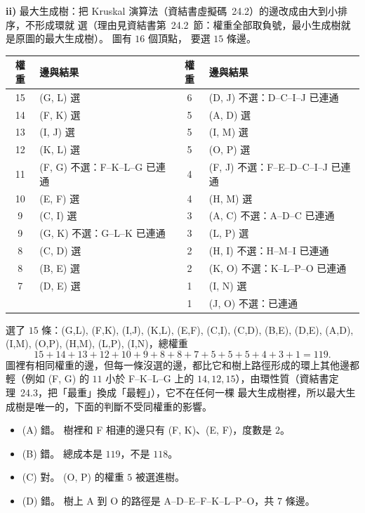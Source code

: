 \begin{pastsoln}
\textbf{ii)} 最大生成樹：把 Kruskal 演算法（資結書虛擬碼~24.2）的邊改成由大到小排序，不形成環就
選（理由見資結書第~24.2~節：權重全部取負號，最小生成樹就是原圖的最大生成樹）。 圖有 $16$ 個頂點，
要選 $15$ 條邊。
\begin{center}
\small
\begin{tabular}{clcl}
\toprule
權重 & 邊與結果 & 權重 & 邊與結果 \\
\midrule
15 & (G, L) 選 & 6 & (D, J) 不選：D--C--I--J 已連通 \\
14 & (F, K) 選 & 5 & (A, D) 選 \\
13 & (I, J) 選 & 5 & (I, M) 選 \\
12 & (K, L) 選 & 5 & (O, P) 選 \\
11 & (F, G) 不選：F--K--L--G 已連通 & 4 & (F, J) 不選：F--E--D--C--I--J 已連通 \\
10 & (E, F) 選 & 4 & (H, M) 選 \\
9 & (C, I) 選 & 3 & (A, C) 不選：A--D--C 已連通 \\
9 & (G, K) 不選：G--L--K 已連通 & 3 & (L, P) 選 \\
8 & (C, D) 選 & 2 & (H, I) 不選：H--M--I 已連通 \\
8 & (B, E) 選 & 2 & (K, O) 不選：K--L--P--O 已連通 \\
7 & (D, E) 選 & 1 & (I, N) 選 \\
 & & 1 & (J, O) 不選：已連通 \\
\bottomrule
\end{tabular}
\end{center}
選了 $15$ 條：(G,L), (F,K), (I,J), (K,L), (E,F), (C,I), (C,D), (B,E), (D,E), (A,D), (I,M), (O,P),
(H,M), (L,P), (I,N)，總權重
\[
15 + 14 + 13 + 12 + 10 + 9 + 8 + 8 + 7 + 5 + 5 + 5 + 4 + 3 + 1 = 119 .
\]
圖裡有相同權重的邊，但每一條沒選的邊，都比它和樹上路徑形成的環上其他邊都輕（例如 (F, G) 的 $11$
小於 F--K--L--G 上的 $14, 12, 15$），由環性質（資結書定理~24.3，把「最重」換成「最輕」），它不在任何一棵
最大生成樹裡，所以最大生成樹是唯一的，下面的判斷不受同權重的影響。
\begin{itemize}
\item (A) 錯。 樹裡和 F 相連的邊只有 (F, K)、(E, F)，度數是 $2$。
\item (B) 錯。 總成本是 $119$，不是 $118$。
\item (C) 對。 (O, P) 的權重 $5$ 被選進樹。
\item (D) 錯。 樹上 A 到 O 的路徑是 A--D--E--F--K--L--P--O，共 $7$ 條邊。
\end{itemize}
\end{pastsoln}
